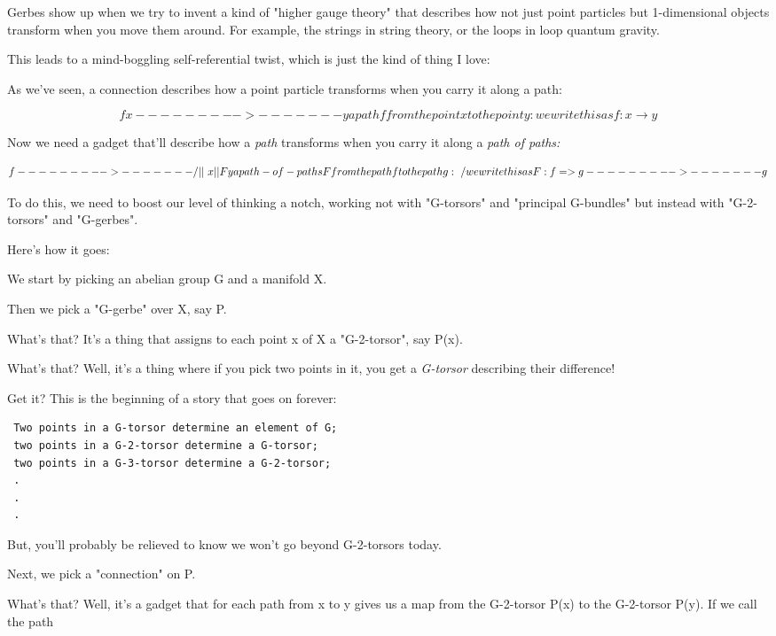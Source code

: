 Gerbes show up when we try to invent a kind of "higher gauge theory" 
that describes how not just point particles but 1-dimensional objects
transform when you move them around.  For example, the strings in string 
theory, or the loops in loop quantum gravity.  

This leads to a mind-boggling self-referential twist, which is just the
kind of thing I love:

As we've seen, a connection describes how a point particle transforms when 
you carry it along a path:

$$
            f
  x--------->-------y     a path f from the point x to the point y:
                                  we write this as f: x \to  y
$$
    
Now we need a gadget that'll describe how a \emph{path} transforms when you 
carry it along a \emph{path of paths:}

$$
             f
    --------->-------
   /        ||       \
  x         ||F       y   a path-of-paths F from the path f to the path g:
   \        \/       /            we write this as F: f => g
    --------->-------
               g
$$
    

To do this, we need to boost our level of thinking a notch, working
not with "G-torsors" and "principal G-bundles" but
instead with "G-2-torsors" and "G-gerbes".

Here's how it goes:

We start by picking an abelian group G and a manifold X.  

Then we pick a "G-gerbe" over X, say P.   

What's that?  It's a thing that assigns to each point x of X a
"G-2-torsor", say P(x).

What's that?  Well, it's a thing where if you pick two points in it, you 
get a \emph{G-torsor} describing their difference!   

Get it?  This is the beginning of a story that goes on forever:

\begin{verbatim}
 Two points in a G-torsor determine an element of G;
 two points in a G-2-torsor determine a G-torsor;
 two points in a G-3-torsor determine a G-2-torsor;
 .
 .
 .
\end{verbatim}
    
But, you'll probably be relieved to know we won't go beyond G-2-torsors 
today.

Next, we pick a "connection" on P.  

What's that?  Well, it's a gadget that for each path from x to y
gives us a map from the G-2-torsor P(x) to the G-2-torsor P(y).
If we call the path

